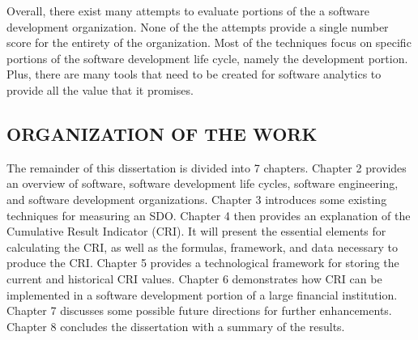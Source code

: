 \documentclass[SDSUThesis.tex]{subfiles}
\begin{document}
    Overall, there exist many attempts to 
    evaluate portions of the a software development 
    organization.  None of the the attempts provide
    a single number score for the entirety of the 
    organization.  Most of the techniques focus on
    specific portions of the software development 
    life cycle, namely the development portion. Plus,
    there are many tools that need to be created for
    software analytics to provide all the value
    that it promises.

\subsection{ORGANIZATION OF THE WORK}

    The remainder of this dissertation is divided into 7 chapters.  Chapter 2 provides
    an overview of software, software development life cycles, software engineering, and software
    development organizations.  Chapter 3 introduces some existing techniques for measuring
    an SDO. Chapter 4 then provides an explanation of the Cumulative
    Result Indicator (CRI).  It will present the essential elements for calculating the CRI, as well
    as the formulas, framework, and data necessary to produce the CRI. Chapter 5 provides
    a technological framework for storing the current and historical CRI values.
    Chapter 6 demonstrates how CRI can be implemented in a software development portion of 
    a large financial institution. Chapter 7 discusses some possible future directions 
    for further enhancements. Chapter 8 concludes the dissertation with a summary
    of the results. 
\end{document}
